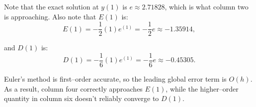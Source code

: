 \begin{enumerate}[label=(\alph*)]
    Note that the exact solution at $y(1)$ is $e \approx 2.71828$, which is what column two is approaching. Also note that $E(1)$ is:
    \begin{equation*}
      E(1) = -\frac{1}{2}(1)e^{(1)} = \boxed{-\frac{1}{2}e \approx -1.35914,}
    \end{equation*}

    and $D(1)$ is:
    \begin{equation*}
      D(1) = -\frac{1}{6}(1)e^{(1)} = \boxed{-\frac{1}{6}e \approx -0.45305.}
    \end{equation*}

    Euler's method is first–order accurate, so the leading global error term is $O(h)$. As a result, column four correctly approaches $E(1)$, while the higher–order quantity in column six doesn't reliably converge to $D(1)$.

\end{enumerate}
